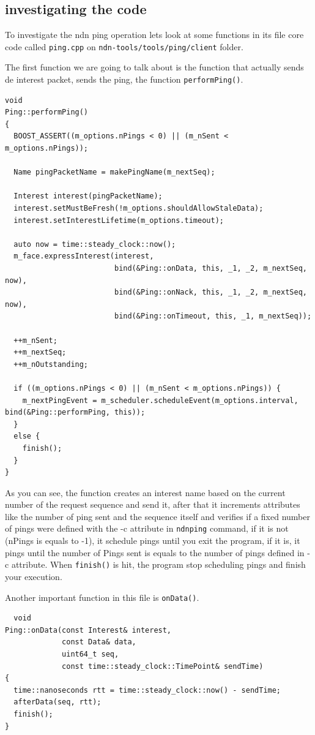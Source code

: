 \documentclass[10pt,letterpaper,extrafontsizes]{memoir}
\begin{document}
\subsection{investigating the code}
To investigate the ndn ping operation lets look at some functions in its file core code called \texttt{ping.cpp} on \texttt{ndn-tools/tools/ping/client} folder. \par The first function we are going to talk about is the function that actually sends de interest packet, sends the ping, the function \texttt{performPing()}.
\clearpage
\begin{lstlisting}
void
Ping::performPing()
{
  BOOST_ASSERT((m_options.nPings < 0) || (m_nSent < m_options.nPings));

  Name pingPacketName = makePingName(m_nextSeq);

  Interest interest(pingPacketName);
  interest.setMustBeFresh(!m_options.shouldAllowStaleData);
  interest.setInterestLifetime(m_options.timeout);

  auto now = time::steady_clock::now();
  m_face.expressInterest(interest,
                         bind(&Ping::onData, this, _1, _2, m_nextSeq, now),
                         bind(&Ping::onNack, this, _1, _2, m_nextSeq, now),
                         bind(&Ping::onTimeout, this, _1, m_nextSeq));

  ++m_nSent;
  ++m_nextSeq;
  ++m_nOutstanding;

  if ((m_options.nPings < 0) || (m_nSent < m_options.nPings)) {
    m_nextPingEvent = m_scheduler.scheduleEvent(m_options.interval, bind(&Ping::performPing, this));
  }
  else {
    finish();
  }
}

\end{lstlisting}
As you can see, the function creates an interest name based on the current number of the request sequence and send it, after that it increments attributes like the number of ping sent and the sequence itself and verifies if a fixed number of pings were defined with the -c attribute in \texttt{ndnping} command, if it is not (nPings is equals to -1), it schedule pings until you exit the program, if it is, it pings until the number of Pings sent is equals to the number of pings defined in -c attribute. When \texttt{finish()} is hit, the program stop scheduling pings and finish your execution.\par
Another important function in this file is \texttt{onData()}.
\begin{lstlisting}
  void
Ping::onData(const Interest& interest,
             const Data& data,
             uint64_t seq,
             const time::steady_clock::TimePoint& sendTime)
{
  time::nanoseconds rtt = time::steady_clock::now() - sendTime;
  afterData(seq, rtt);
  finish();
}
\end{lstlisting}
\end{document}
